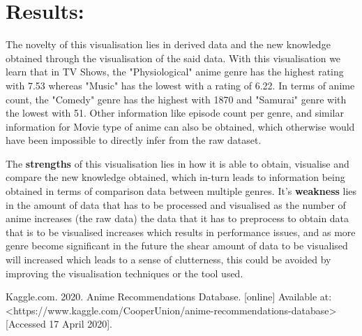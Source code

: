 \documentclass[a4paper, 10pt]{article}
\begin{document}
\section{Results:}
\qquad The novelty of this visualisation lies in derived data and the new knowledge obtained through the visualisation of the said data. With this visualisation we learn that in TV Shows, the "Physiological" anime genre has the highest rating with 7.53 whereas "Music" has the lowest with a rating of 6.22. In terms of anime count, the "Comedy" genre has the highest with 1870 and "Samurai" genre with the lowest with 51. Other information like episode count per genre, and similar information for Movie type of anime can also be obtained, which otherwise would have been impossible to directly infer from the raw dataset.

\qquad The \textbf{strengths} of this visualisation lies in how it is able to obtain, visualise and compare the new knowledge obtained, which in-turn leads to information being obtained in terms of comparison data between multiple genres. It's \textbf{weakness} lies in the amount of data that has to be processed and visualised as the number of anime increases (the raw data) the data that it has to preprocess to obtain data that is to be visualised increases which results in performance issues, and as more genre become significant in the future the shear amount of data to be visualised will increased which leads to a sense of clutterness, this could be avoided by improving the visualisation techniques or the tool used. 

\begin{thebibliography}{9}
Kaggle.com. 2020. Anime Recommendations Database. [online] Available at: <https://www.kaggle.com/CooperUnion/anime-recommendations-database> [Accessed 17 April 2020].

\end{thebibliography}
\end{document}

